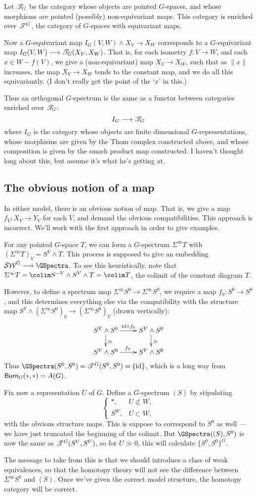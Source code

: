 \documentclass[11pt]{article}
\newcommand{\rednote}[1]{{\color{red}#1}\scalebox{.1}{rednote}}
\begin{document}
Let $\mathscr{T}_G$ be the category whose objects are pointed $G$-spaces, and whose morphisms are pointed (possibly) non-equivariant maps. This category is enriched over $\mathscr{T}^G$, the category of $G$-spaces with equivariant maps.

Now a $G$-equivariant map $I_G(V,W)\wedge X_V\to X_W$ corresponds to a $G$-equivariant map $I_G(V,W)\longrightarrow \mathscr{T}_G(X_V,X_W)$. That is, for each isometry $f:V\to W$, and each $x\in W-f(V)$, we give a (non-equivariant) map $X_V\to X_W$, such that as $\|x\|$ increases, the map $X_V\to X_W$ tends to the constant map, and we do all this equivariantly. \rednote{(I don't really get the point of the `$x$' in this.)}

Thus an orthogonal $G$-spectrum is the same as a functor between categories enriched over $\mathscr{T}_G$:
\[I_G\longrightarrow\mathscr{T}_G\]
where $I_G$ is the category whose objects are finite dimensional $G$-representations, whose morphisms are given by the Thom complex constructed above, and whose composition is given by the smash product map constructed. \rednote{I haven't thought long about this, but assume it's what he's getting at.}
\subsection*{The obvious notion of a map}
In either model, there is an obvious notion of map. That is, we give a map $f_V:X_V\to Y_V$ for each $V$, and demand the obvious compatibilities. This approach is incorrect. We'll work with the first approach in order to give examples.
\begin{exmp*}
For any pointed $G$-space $T$, we can form a $G$-spectrum $\Sigma^\infty T$ with $(\Sigma^\infty T)_V=S^V\wedge T$. This process is supposed to give an embedding $\GSW\to\GSpectra$. To see this heuristically, note that $\Sigma^\infty T=\colim S^{-V}\wedge S^V\wedge T=\colim T$, the colimit of the constant diagram $T$. 

However, to define a spectrum map $\Sigma^\infty S^0\to \Sigma^\infty S^0$, we require a map $f_0:S^0\to S^0$, and this determines everything else via the compatibility with the structure map $S^V\wedge(\Sigma^\infty S^0)_0\to(\Sigma^\infty S^0)_V$ (drawn vertically):
\[\xymatrix@R=.6cm{ 
\ar[d]^\simeq S^V\wedge S^0\ar[r]^{\id\wedge f_0}&S^V\wedge S^0\ar[d]^\simeq\\
S^V\wedge S^0\ar[r]^{f_V}&S^V\wedge S^0
}\]
Thus $\GSpectra(S^0,S^0)=\scrT^G(S^0,S^0)=\{\id\}$, which is a long way from $\operatorname{{\mathsf{Burn}}}_G(*,*)=A(G)$.
\end{exmp*}
Fix now a representation $U$ of $G$. Define a $G$-spectrum $(S)$ by stipulating
\[\begin{cases} *,&U\not\subset W,\\ S^W,&U\subset W,\end{cases}\]
with the obvious structure maps. This is suppose to correspond to $S^0$ as well --- we have just truncated the beginning of the colimit. But $\GSpectra((S),S^0)$ is now the same as $\mathscr{T}^G(S^U,S^U)$, so for $U\gg0$, this will calculate $\{S^0,S^0\}^G$.

The message to take from this is that we should introduce a class of weak equivalences, so that the homotopy theory will not see the difference between $\Sigma^\infty S^0$ and $(S)$. Once we've given the correct model structure, the homotopy category will be correct.
\end{document}
